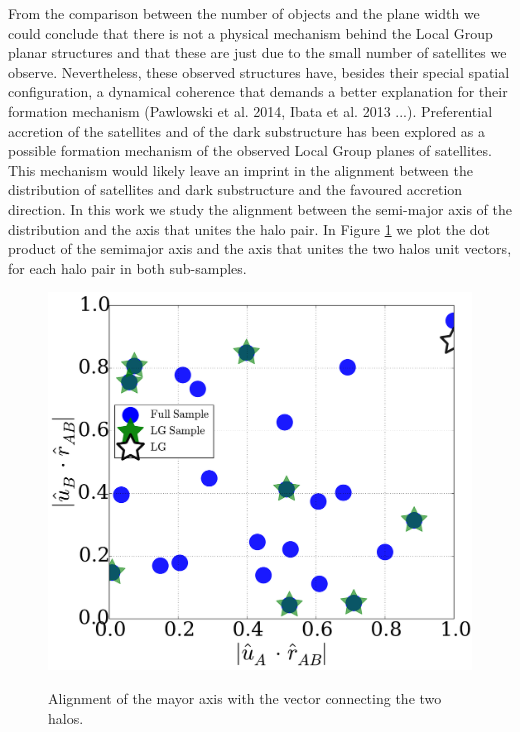 From the comparison between the number of objects and the plane width we could conclude that there is not a physical mechanism behind the Local Group planar structures and that these are just due to the small number of satellites we observe. 
Nevertheless, these observed structures have, besides their special spatial configuration, a dynamical coherence that demands a better explanation for their formation mechanism (Pawlowski et al. 2014, Ibata et al. 2013 ...).
Preferential accretion of the satellites and of the dark substructure has been explored as a possible formation mechanism of the observed Local Group planes of satellites. 
This mechanism would likely leave an imprint in the alignment between the distribution of satellites and dark substructure and the favoured accretion direction.     
In this work we study the alignment between the semi-major axis of the distribution and the axis that unites the halo pair. 
In Figure \ref{fig:lg_alignment} we plot the dot product of the semimajor axis and the axis that unites the two halos unit vectors, for each halo pair in both sub-samples. 


\begin{figure}
\includegraphics[width=\hsize]{r_u_alignment.pdf}\\
\caption{Alignment of the mayor axis with the vector connecting the
 two halos.}
\label{fig:lg_alignment}
\end{figure}

